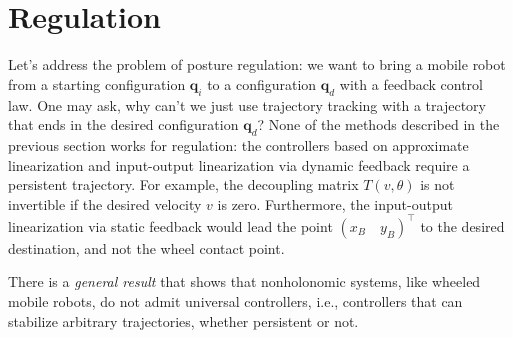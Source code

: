 \documentclass[10pt, a4paper]{report}
\newcommand{\q}{{\mathbf q}}
\begin{document}
\section{Regulation}
Let's address the problem of posture regulation: we want to bring a mobile robot from a starting configuration $\q_i$ to a configuration $\q_d$ with a feedback control law. One may ask, why can't we just use trajectory tracking with a trajectory that ends in the desired configuration $\q_d$? None of the methods described in the previous section works for regulation: the controllers based on approximate linearization and input-output linearization via dynamic feedback require a persistent trajectory. For example, the decoupling matrix $T(v,\theta)$ is not invertible if the desired velocity $v$ is zero. Furthermore, the input-output linearization via static feedback would lead the point $(x_B\quad y_B)^\top$ to the desired destination, and not the wheel contact point.\bigskip

There is a \textit{general result} that shows that nonholonomic systems, like wheeled mobile robots, do not admit universal controllers, i.e., controllers that can stabilize arbitrary
trajectories, whether persistent or not.
\end{document}
